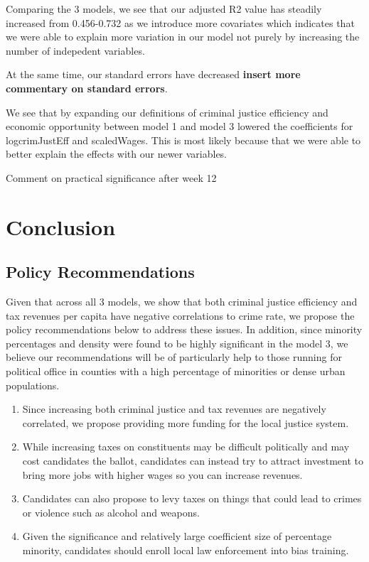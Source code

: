 \documentclass[]{article}
\begin{document}
Comparing the 3 models, we see that our adjusted R2 value has steadily
increased from 0.456-0.732 as we introduce more covariates which
indicates that we were able to explain more variation in our model not
purely by increasing the number of indepedent variables.

At the same time, our standard errors have decreased \textbf{insert more
commentary on standard errors}.

We see that by expanding our definitions of criminal justice efficiency
and economic opportunity between model 1 and model 3 lowered the
coefficients for logcrimJustEff and scaledWages. This is most likely
because that we were able to better explain the effects with our newer
variables.

Comment on practical significance after week 12

\hypertarget{conclusion}{%
\section{Conclusion}\label{conclusion}}

\hypertarget{policy-recommendations}{%
\subsection{Policy Recommendations}\label{policy-recommendations}}

Given that across all 3 models, we show that both criminal justice
efficiency and tax revenues per capita have negative correlations to
crime rate, we propose the policy recommendations below to address these
issues. In addition, since minority percentages and density were found
to be highly significant in the model 3, we believe our recommendations
will be of particularly help to those running for political office in
counties with a high percentage of minorities or dense urban
populations.

\begin{enumerate}
\def\labelenumi{\arabic{enumi}.}
\item
  Since increasing both criminal justice and tax revenues are negatively
  correlated, we propose providing more funding for the local justice
  system.
\item
  While increasing taxes on constituents may be difficult politically
  and may cost candidates the ballot, candidates can instead try to
  attract investment to bring more jobs with higher wages so you can
  increase revenues.
\item
  Candidates can also propose to levy taxes on things that could lead to
  crimes or violence such as alcohol and weapons.
\item
  Given the significance and relatively large coefficient size of
  percentage minority, candidates should enroll local law enforcement
  into bias training.
\end{enumerate}
\end{document}
